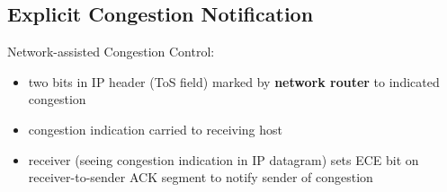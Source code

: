 \subsection{Explicit Congestion Notification}
Network-assisted Congestion Control:
\begin{itemize}
	\item two bits in IP header (ToS field) marked by \textbf{network router} to indicated congestion
	\item congestion indication carried to receiving host
	\item receiver (seeing congestion indication in IP datagram) sets ECE bit on receiver-to-sender ACK segment to notify sender of congestion
\end{itemize}
